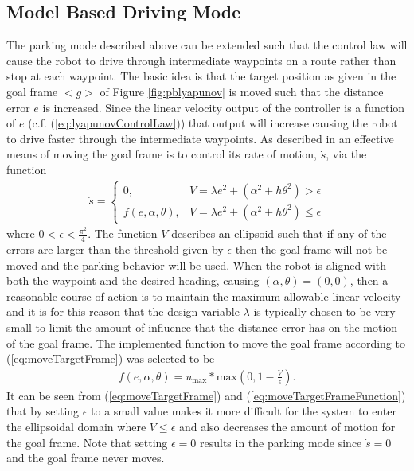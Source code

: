 \subsection{Model Based Driving Mode}
\label{sec:drivingMode}
The parking mode described above can be extended such that the control law will cause the robot to drive through intermediate waypoints on a route rather than stop at each waypoint. The basic idea is that the target position as given in the goal frame $<g>$ of Figure \ref{fig:pblyapunov} is moved such that the distance error $e$ is increased. Since the linear velocity output of the controller is a function of $e$ (c.f. (\ref{eq:lyapunovControlLaw})) that output will increase causing the robot to drive faster through the intermediate waypoints. As described in \cite{Aicardi_UnicycleLyapunov95} an effective means of moving the goal frame is to control its rate of motion, $\dot{s}$, via the function
\begin{align}
\label{eq:moveTargetFrame}
\dot{s} =
\begin{cases}
0, & V = \lambda e^2 + (\alpha^2+h\theta^2) > \epsilon \\
f(e,\alpha,\theta), & V = \lambda e^2 + (\alpha^2+h\theta^2) \leq \epsilon
\end{cases}
\end{align}
where $0<\epsilon<\frac{\pi^2}{4}$. The function $V$ describes an ellipsoid such that if any of the errors are larger than the threshold given by $\epsilon$ then the goal frame will not be moved and the parking behavior will be used. When the robot is aligned with both the waypoint and the desired heading, causing $(\alpha,\theta)=(0,0)$, then a reasonable course of action is to maintain the maximum allowable linear velocity and it is for this reason that the design variable $\lambda$ is typically chosen to be very small to limit the amount of influence that the distance error has on the motion of the goal frame. The implemented function to move the goal frame according to (\ref{eq:moveTargetFrame}) was selected to be
\begin{align}
\label{eq:moveTargetFrameFunction}
f(e,\alpha,\theta) = u_{\text{max}} * \text{max}\left(0, 1 - \frac{V}{\epsilon}\right).
\end{align}
It can be seen from (\ref{eq:moveTargetFrame}) and (\ref{eq:moveTargetFrameFunction}) that by setting $\epsilon$ to a small value makes it more difficult for the system to enter the ellipsoidal domain where $V\leq\epsilon$ and also decreases the amount of motion for the goal frame. Note that setting $\epsilon=0$ results in the parking mode since $\dot{s}=0$ and the goal frame never moves.

